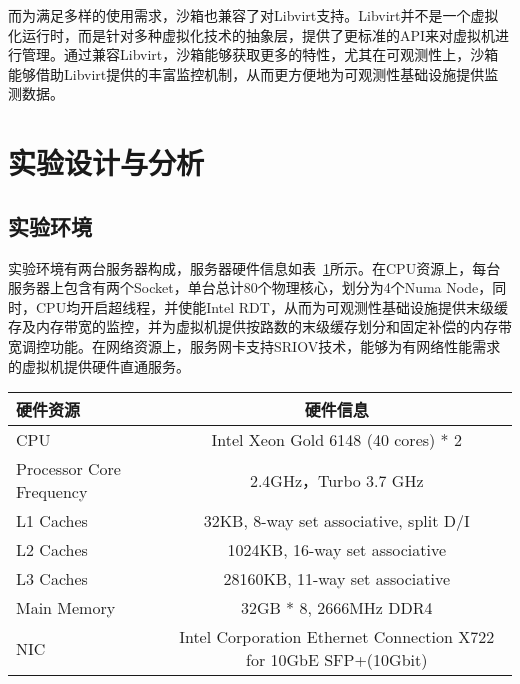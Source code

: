 而为满足多样的使用需求，沙箱也兼容了对Libvirt支持。Libvirt并不是一个虚拟化运行时，而是针对多种虚拟化技术的抽象层，提供了更标准的API来对虚拟机进行管理。通过兼容Libvirt，沙箱能够获取更多的特性，尤其在可观测性上，沙箱能够借助Libvirt提供的丰富监控机制，从而更方便地为可观测性基础设施提供监测数据。


\section{实验设计与分析}

\subsection{实验环境}

实验环境有两台服务器构成，服务器硬件信息如表~\ref{tab:exp_env}所示。在CPU资源上，每台服务器上包含有两个Socket，单台总计80个物理核心，划分为4个Numa Node，同时，CPU均开启超线程，并使能Intel RDT，从而为可观测性基础设施提供末级缓存及内存带宽的监控，并为虚拟机提供按路数的末级缓存划分和固定补偿的内存带宽调控功能。在网络资源上，服务网卡支持SRIOV技术，能够为有网络性能需求的虚拟机提供硬件直通服务。

\begin{table}[H]
    \label{tab:exp_env}
    \footnotesize%
    \setlength{\tabcolsep}{4pt}%
    \renewcommand{\arraystretch}{1.25}%
    \centering
    \begin{tabular}{lc}
        \hline
        硬件资源 & 硬件信息 \\
        \hline
        CPU & Intel Xeon Gold 6148 (40 cores) * 2 \\
        Processor Core Frequency & 2.4GHz，Turbo 3.7 GHz \\
        L1 Caches & 32KB,  8-way set associative, split D/I \\
        L2 Caches & 1024KB, 16-way set associative \\
        L3 Caches & 28160KB, 11-way set associative \\
        Main Memory & 32GB * 8, 2666MHz DDR4 \\
        NIC & Intel Corporation Ethernet Connection X722 for 10GbE SFP+(10Gbit) \\
        \hline
    \end{tabular}
\end{table}

